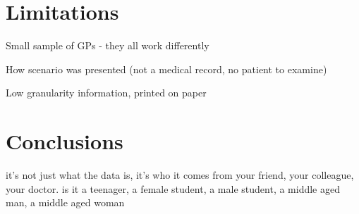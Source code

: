 \documentclass{sigchi}
\begin{document}



\section{Limitations}

Small sample of GPs - they all work differently

How scenario was presented (not a medical record, no patient to examine)

Low granularity information, printed on paper



\section{Conclusions}



it's not just what the data is, it's who it comes from {your friend, your colleague, your doctor}. is it {a teenager, a female student, a male student, a middle aged man, a middle aged woman}




\end{document}
